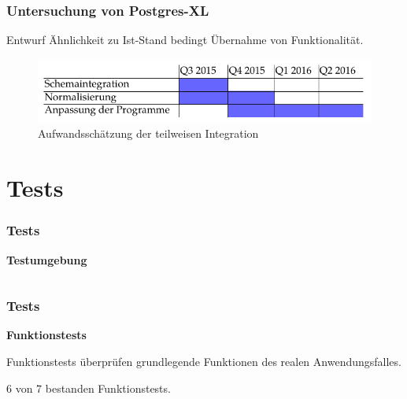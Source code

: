 \documentclass{beamer}
\begin{document}
\begin{frame}\frametitle{Untersuchung von Postgres-XL}
\begin{block}{Entwurf}
Ähnlichkeit zu Ist-Stand bedingt Übernahme von Funktionalität.
\end{block}

\begin{figure}
\centering
\includegraphics[width=1\hsize]{../Abbildungen/gantt_aufwand_umsetzung_cropped.pdf}
\caption{Aufwandsschätzung der teilweisen Integration}
\end{figure}
\end{frame}

\section{Tests}

\begin{frame}\frametitle{Tests}
\centering\textbf{Testumgebung}

   \begin{columns}
    \begin{column}{.5\textwidth}

    \end{column}
    \begin{column}{.5\textwidth}
\resizebox{1\linewidth}{!}{}
    \end{column}
  \end{columns}
\end{frame}

\begin{frame}\frametitle{Tests}
\centering\textbf{Funktionstests}\\

\vspace{\baselineskip}
\vspace{\baselineskip}

Funktionstests überprüfen grundlegende Funktionen des realen Anwendungsfalles.

\vspace{\baselineskip}
\vspace{\baselineskip}

6 von 7 bestanden Funktionstests.
\end{frame}
\end{document}

